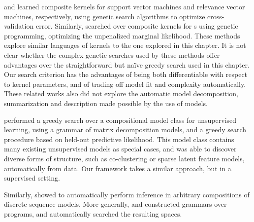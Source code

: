 \citet{diosan2007evolving} and \citet{bing2010gp} learned composite kernels for support vector machines and relevance vector machines, respectively, using genetic search algorithms to optimize cross-validation error.
Similarly, \citet{kronberger2013evolution} searched over composite kernels for \gp{}s using genetic programming, optimizing the unpenalized marginal likelihood.
These methods explore similar languages of kernels to the one explored in this chapter.
It is not clear whether the complex genetic searches used by these methods offer advantages over the straightforward but na\"{i}ve greedy search used in this chapter.
Our search criterion has the advantages of being both differentiable with respect to kernel parameters, and of trading off model fit and complexity automatically.
These related works also did not explore the automatic model decomposition, summarization and description made possible by the use of \gp{} models.


\citet{grosse2012exploiting} performed a greedy search over a compositional model class for unsupervised learning, using a grammar of matrix decomposition models, and a greedy search procedure based on held-out predictive likelihood.
This model class contains many existing unsupervised models as special cases, and was able to discover diverse forms of structure, such as co-clustering or sparse latent feature models, automatically from data.
Our framework takes a similar approach, but in a supervised setting.

Similarly, \citet{christian-thesis} showed to automatically perform inference in arbitrary compositions of discrete sequence models.
More generally, \citet{dechter2013bootstrap} and \citet{liang2010learning} constructed grammars over programs, and automatically searched the resulting spaces.




